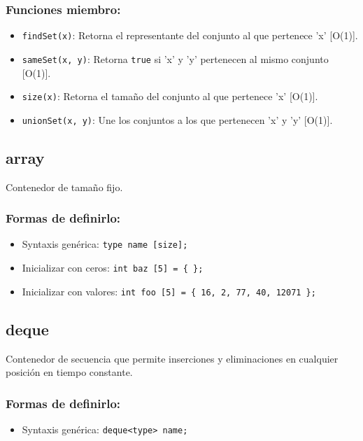 \subsubsection{Funciones miembro:}
\begin{itemize}
  \item \texttt{findSet(x)}: Retorna el representante del conjunto al que pertenece 'x' [O(1)].
  \item \texttt{sameSet(x, y)}: Retorna \texttt{true} si 'x' y 'y' pertenecen al mismo conjunto [O(1)].
  \item \texttt{size(x)}: Retorna el tamaño del conjunto al que pertenece 'x' [O(1)].
  \item \texttt{unionSet(x, y)}: Une los conjuntos a los que pertenecen 'x' y 'y' [O(1)].
\end{itemize}

\subsection{array}
\label{subsec:std_array}
Contenedor de tamaño fijo. 

\subsubsection{Formas de definirlo:}
\begin{itemize}
  \item Syntaxis genérica: \texttt{type name [size];}
  \item Inicializar con ceros: \texttt{int baz [5] = \{ \};}
  \item Inicializar con valores: \texttt{int foo [5] = \{ 16, 2, 77, 40, 12071 \};}
\end{itemize}

\subsection{deque}
\label{subsec:std_deque}
Contenedor de secuencia que permite inserciones y eliminaciones en cualquier posición en tiempo constante.

\subsubsection{Formas de definirlo:}
\begin{itemize}
  \item Syntaxis genérica: \texttt{deque<type> name;}
\end{itemize}

